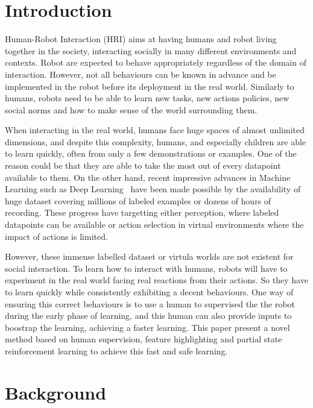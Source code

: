 \documentclass[letterpaper]{article} %
\begin{document}
\section{Introduction}

Human-Robot Interaction (HRI) aims at having humans and robot living together
in the society, interacting socially in many different environments and
contexts. Robot are expected to behave appropriately regardless of the domain
of interaction. However, not all behaviours can be known in advance and be
implemented in the robot before its deployment in the real world. Similarly to
 humans, robots need
to be able to learn new tasks, new actions policies, new social norms and how
to make sense of the world surrounding them.

When interacting in the real world, humans face huge spaces of almost unlimited
dimensions, and despite this complexity, humans, and especially children are able
to learn quickly, often from only a few demonstrations or examples. One of the
 reason could be that they are able to take the most out of every datapoint available to them. 
 On the other
hand, recent impressive advances in Machine Learning such as Deep Learning~\cite{lecun2015deep}
have been made possible by the availability of huge dataset covering millions
of labeled examples or dozens of hours of recording. These progress have
targetting either perception, where labeled datapoints can be available or
action selection in virtual environments where the impact of actions is
limited.

However, these immense labelled dataset or virtula worlds are not existent for
social interaction. To learn how to interact with humans, robots will have to
experiment in the real world facing real reactions from their actions. So they
have to learn quickly while consistently exhibiting a decent behaviours.
One way of ensuring this correct  behaviours is to use a human to supervised the
the robot during the early phase of learning, and this human can also provide
inputs to boostrap the learning, achieving a faster learning. This paper present
a novel method based on human supervision, feature highlighting and partial
state reinforcement learning to achieve this fast and safe learning.


\section{Background}
\end{document}
